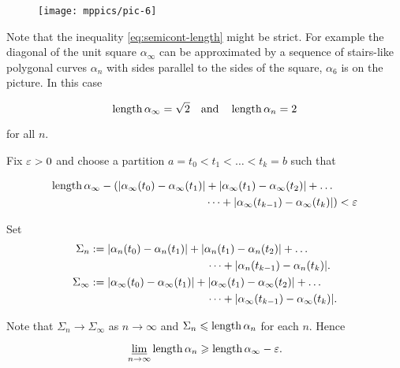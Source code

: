 \begin{wrapfigure}{r}{20 mm}

\vskip-0mm

\centering

\texttt{[image: mppics/pic-6]}

\end{wrapfigure}



Note that the inequality \ref{eq:semicont-length}%
might be strict.
For example the diagonal of the unit square $\alpha_\infty$ 
can be  approximated by a sequence of stairs-like
polygonal curves $\alpha_n$
with sides parallel to the sides of the square,
$\alpha_6$ is on the picture.
In this case

\[\mathop{\rm length}\nolimits\alpha_\infty=\sqrt{2}\quad
\text{and}\quad \mathop{\rm length}\nolimits\alpha_n=2\]

for all $n$.



Fix $\varepsilon > 0$ and choose a partition $a=t_0<t_1<\dots<t_k=b$
such that 

\begin{align*}
\mathop{\rm length}\nolimits\alpha_\infty-
(|\alpha_\infty(t_0)-\alpha_\infty(t_1)|&+|\alpha_\infty(t_1)-\alpha_\infty(t_2)|+\dots
\\
&\dots+|\alpha_\infty(t_{k-1})-\alpha_\infty(t_k)|)<\varepsilon
\end{align*}





Set 
\begin{align*}\Sigma_n
&\df
|\alpha_n(t_0)-\alpha_n(t_1)|+|\alpha_n(t_1)-\alpha_n(t_2)|+\dots
\\
&\ \ \ \ \ \ \ \ \ \ \ \ \ \ \ \ \ \ \ \ \ \ \ \ \ \ \ \ \ \ \ \ \dots+|\alpha_n(t_{k-1})-\alpha_n(t_k)|.
\\
\Sigma_\infty
&\df
|\alpha_\infty(t_0)-\alpha_\infty(t_1)|+|\alpha_\infty(t_1)-\alpha_\infty(t_2)|+\dots
\\
&\ \ \ \ \ \ \ \ \ \ \ \ \ \ \ \ \ \ \ \ \ \ \ \ \ \ \ \ \ \ \ \ \dots+|\alpha_\infty(t_{k-1})-\alpha_\infty(t_k)|.
\end{align*}

Note that $\Sigma_n\to \Sigma_\infty$ as $n\to\infty$
and $\Sigma_n\leqslant\mathop{\rm length}\nolimits\alpha_n$ for each $n$.
Hence

$$\varliminf_{n\to\infty} \mathop{\rm length}\nolimits\alpha_n \geqslant \mathop{\rm length}\nolimits\alpha_\infty-\varepsilon.$$

